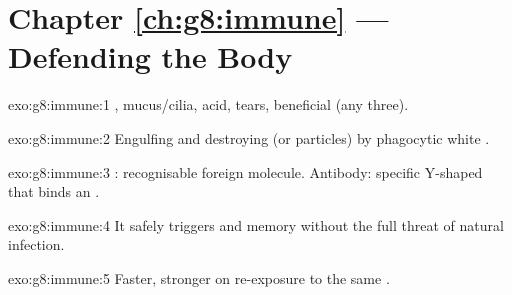 \section*{Chapter \ref{ch:g8:immune} --- Defending the Body}

\begin{solution}{exo:g8:immune:1}
, mucus/cilia,  acid, tears, beneficial  (any three).
\end{solution}

\begin{solution}{exo:g8:immune:2}
Engulfing and destroying  (or particles) by phagocytic white
 .
\end{solution}

\begin{solution}{exo:g8:immune:3}
: recognisable foreign molecule. Antibody: specific Y-shaped
 that binds an .
\end{solution}

\begin{solution}{exo:g8:immune:4}
It safely triggers  and memory without the full 
threat of natural infection.
\end{solution}

\begin{solution}{exo:g8:immune:5}
Faster, stronger  on re-exposure to the same .
\end{solution}

